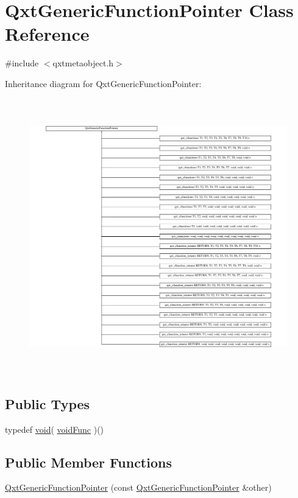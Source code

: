\hypertarget{class_qxt_generic_function_pointer}{\section{Qxt\-Generic\-Function\-Pointer Class Reference}
\label{class_qxt_generic_function_pointer}
}


{\ttfamily \#include $<$qxtmetaobject.\-h$>$}

Inheritance diagram for Qxt\-Generic\-Function\-Pointer\-:\begin{figure}[H]
\begin{center}
\leavevmode
\includegraphics[height=11.992552cm]{class_qxt_generic_function_pointer}
\end{center}
\end{figure}
\subsection*{Public Types}
\begin{DoxyCompactItemize}
\item 
typedef \hyperlink{group___u_a_v_objects_plugin_ga444cf2ff3f0ecbe028adce838d373f5c}{void}( \hyperlink{class_qxt_generic_function_pointer_a280e21b8a04a2f7c8f5cf7aeeeb2fd33}{void\-Func} )()
\end{DoxyCompactItemize}
\subsection*{Public Member Functions}
\begin{DoxyCompactItemize}
\item 
\hyperlink{class_qxt_generic_function_pointer_a28335fecb0d36012b8d586601b22fbc5}{Qxt\-Generic\-Function\-Pointer} (const \hyperlink{class_qxt_generic_function_pointer}{Qxt\-Generic\-Function\-Pointer} \&other)
\end{DoxyCompactItemize}
